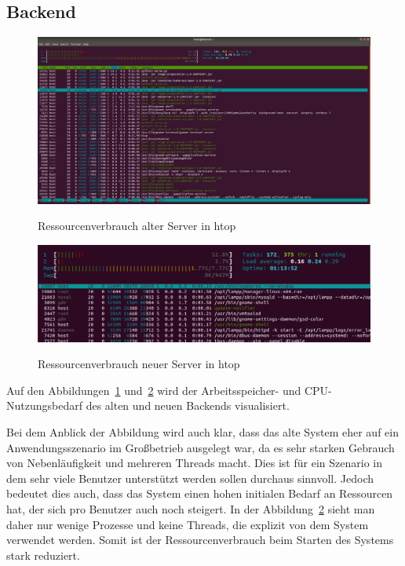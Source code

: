 \subsection{Backend}
\begin{figure}[ht]
   \centering
     \includegraphics[width=15cm]{Bilder/server-ihatestau} \\
 \caption{Ressourcenverbrauch alter Server in htop}
 \label{fig:ihatestau-res}
\end{figure}
\begin{figure}[ht]
   \centering
     \includegraphics[width=15cm]{Bilder/server-new} \\
 \caption{Ressourcenverbrauch neuer Server in htop}
 \label{fig:new-server-res}
\end{figure}

Auf den Abbildungen~\ref{fig:ihatestau-res} und~\ref{fig:new-server-res} wird der Arbeitsspeicher- und CPU-Nutzungsbedarf des alten und neuen Backends visualisiert.

Bei dem Anblick der Abbildung wird auch klar, dass das alte System eher auf ein Anwendungsszenario im Großbetrieb ausgelegt war, da es sehr starken Gebrauch von Nebenläufigkeit und mehreren Threads macht.
Dies ist für ein Szenario in dem sehr viele Benutzer unterstützt werden sollen durchaus sinnvoll.
Jedoch bedeutet dies auch, dass das System einen hohen initialen Bedarf an Ressourcen hat, der sich pro Benutzer auch noch steigert.
In der Abbildung~\ref{fig:new-server-res} sieht man daher nur wenige Prozesse und keine Threads, die explizit von dem System verwendet werden.
Somit ist der Ressourcenverbrauch beim Starten des Systems stark reduziert.

